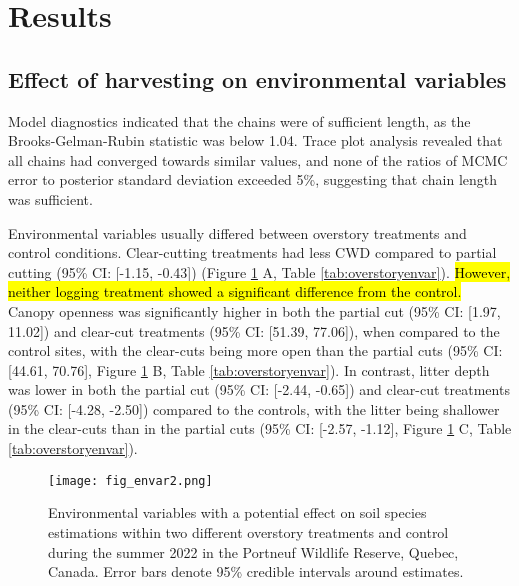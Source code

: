 \clearpage

\section*{Results}
\label{sec:results1}


\subsection*{Effect of harvesting on environmental variables}
\label{subsec:ResEnv}

Model diagnostics indicated that the chains were of sufficient length, as the Brooks-Gelman-Rubin statistic was below 1.04. 
Trace plot analysis revealed that all chains had converged towards similar values, and none of the ratios of MCMC error to posterior standard deviation exceeded 5\%, suggesting that chain length was sufficient.

Environmental variables usually differed between overstory treatments and control conditions. 
Clear-cutting treatments had less CWD compared to partial cutting (95\% CI: [-1.15, -0.43]) (Figure \ref{fig:envar} A, Table \ref{tab:overstoryenvar}). 
\hl{However, neither logging treatment showed a significant difference from the control.}
Canopy openness was significantly higher in both the partial cut (95\% CI: [1.97, 11.02]) and clear-cut treatments (95\% CI: [51.39, 77.06]), when compared 
to the control sites, with the clear-cuts being more open than the partial cuts (95\% CI: [44.61, 70.76], Figure \ref{fig:envar} B, Table \ref{tab:overstoryenvar}). 
In contrast, litter depth was lower in both the partial cut (95\% CI: [-2.44, -0.65]) and clear-cut treatments (95\% CI: [-4.28, -2.50]) compared to the controls, 
with the litter being shallower in the clear-cuts than in the partial cuts (95\% CI: [-2.57, -1.12], Figure \ref{fig:envar} C, Table \ref{tab:overstoryenvar}).


\vspace{10pt}

\begin{figure}[ht]
  \centering
  \texttt{[image: fig\_envar2.png]}
  \caption[Environmental variables with a potential effect on soil species within two different overstory treatments and control.]
  {Environmental variables with a potential effect on soil species estimations within two different overstory treatments and control 
  during the summer 2022 in the Portneuf Wildlife Reserve, Quebec, Canada. Error bars denote 95\% credible intervals around estimates.}
  \label{fig:envar}
\end{figure}

